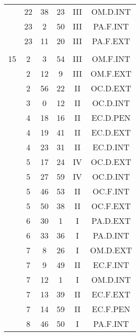 \documentclass[12pt, a4paper]{article}
\begin{document}
\begin{multicols}{3}
{\begin{tabular}{c c c c c c}
	 	 	 	 & 22 & 38 & 23 & III & OM.D.INT\\%
	 	 	 	 & 23 & 2 & 50 & III & PA.F.INT\\%
	 	 	 	 & 23 & 11 & 20 & III & PA.F.EXT\\%
	 	 	 	 & & & & & \\%
	 	 	 	15 & 2 & 3 & 54 & III & OM.F.INT\\%
	 	 	 	 & 2 & 12 & 9 & III & OM.F.EXT\\%
	 	 	 	 & 2 & 56 & 22 & II & OC.D.EXT\\%
	 	 	 	 & 3 & 0 & 12 & II & OC.D.INT\\%
	 	 	 	 & 4 & 18 & 16 & II & EC.D.PEN\\%
	 	 	 	 & 4 & 19 & 41 & II & EC.D.EXT\\%
	 	 	 	 & 4 & 23 & 31 & II & EC.D.INT\\%
	 	 	 	 & 5 & 17 & 24 & IV & OC.D.EXT\\%
	 	 	 	 & 5 & 27 & 59 & IV & OC.D.INT\\%
	 	 	 	 & 5 & 46 & 53 & II & OC.F.INT\\%
	 	 	 	 & 5 & 50 & 38 & II & OC.F.EXT\\%
	 	 	 	 & 6 & 30 & 1 & I & PA.D.EXT\\%
	 	 	 	 & 6 & 33 & 36 & I & PA.D.INT\\%
	 	 	 	 & 7 & 8 & 26 & I & OM.D.EXT\\%
	 	 	 	 & 7 & 9 & 49 & II & EC.F.INT\\%
	 	 	 	 & 7 & 12 & 1 & I & OM.D.INT\\%
	 	 	 	 & 7 & 13 & 39 & II & EC.F.EXT\\%
	 	 	 	 & 7 & 14 & 59 & II & EC.F.PEN\\%
	 	 	 	 & 8 & 46 & 50 & I & PA.F.INT\\%

\end{tabular}}
\end{multicols}
\end{document}
